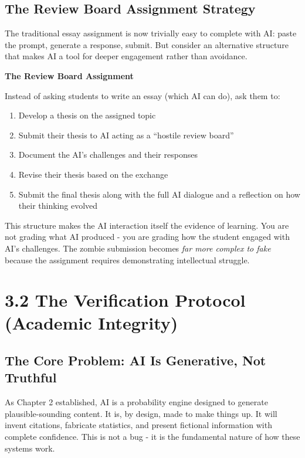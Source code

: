 \documentclass[
  letterpaper,
  DIV=11,
  numbers=noendperiod]{scrreprt}
\providecommand{\tightlist}{%
  \setlength{\itemsep}{0pt}\setlength{\parskip}{0pt}}
\begin{document}
\subsection{The Review Board Assignment
Strategy}\label{the-review-board-assignment-strategy}

The traditional essay assignment is now trivially easy to complete with
AI: paste the prompt, generate a response, submit. But consider an
alternative structure that makes AI a tool for deeper engagement rather
than avoidance.

\textbf{The Review Board Assignment}

Instead of asking students to write an essay (which AI can do), ask them
to:

\begin{enumerate}
\def\labelenumi{\arabic{enumi}.}
\tightlist
\item
  Develop a thesis on the assigned topic
\item
  Submit their thesis to AI acting as a ``hostile review board''
\item
  Document the AI's challenges and their responses
\item
  Revise their thesis based on the exchange
\item
  Submit the final thesis along with the full AI dialogue and a
  reflection on how their thinking evolved
\end{enumerate}

This structure makes the AI interaction itself the evidence of learning.
You are not grading what AI produced - you are grading how the student
engaged with AI's challenges. The zombie submission becomes \emph{far
more complex to fake} because the assignment requires demonstrating
intellectual struggle.

\section{3.2 The Verification Protocol (Academic
Integrity)}\label{the-verification-protocol-academic-integrity}

\subsection{The Core Problem: AI Is Generative, Not
Truthful}\label{the-core-problem-ai-is-generative-not-truthful}

As Chapter 2 established, AI is a probability engine designed to
generate plausible-sounding content. It is, by design, made to make
things up. It will invent citations, fabricate statistics, and present
fictional information with complete confidence. This is not a bug - it
is the fundamental nature of how these systems work.
\end{document}

